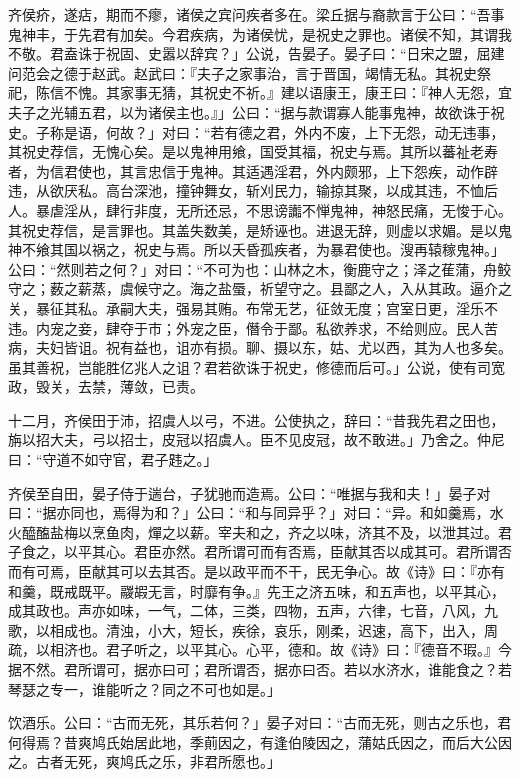 \documentclass[]{article}
\begin{document}
齐侯疥，遂痁，期而不瘳，诸侯之宾问疾者多在。梁丘据与裔款言于公曰：``吾事鬼神丰，于先君有加矣。今君疾病，为诸侯忧，是祝史之罪也。诸侯不知，其谓我不敬。君盍诛于祝固、史嚣以辞宾？」公说，告晏子。晏子曰：``日宋之盟，屈建问范会之德于赵武。赵武曰：『夫子之家事治，言于晋国，竭情无私。其祝史祭祀，陈信不愧。其家事无猜，其祝史不祈。』建以语康王，康王曰：『神人无怨，宜夫子之光辅五君，以为诸侯主也。』」公曰：``据与款谓寡人能事鬼神，故欲诛于祝史。子称是语，何故？」对曰：``若有德之君，外内不废，上下无怨，动无违事，其祝史荐信，无愧心矣。是以鬼神用飨，国受其福，祝史与焉。其所以蕃祉老寿者，为信君使也，其言忠信于鬼神。其适遇淫君，外内颇邪，上下怨疾，动作辟违，从欲厌私。高台深池，撞钟舞女，斩刈民力，输掠其聚，以成其违，不恤后人。暴虐淫从，肆行非度，无所还忌，不思谤讟不惮鬼神，神怒民痛，无悛于心。其祝史荐信，是言罪也。其盖失数美，是矫诬也。进退无辞，则虚以求媚。是以鬼神不飨其国以祸之，祝史与焉。所以夭昏孤疾者，为暴君使也。溲再辕稼鬼神。」公曰：``然则若之何？」对曰：``不可为也：山林之木，衡鹿守之；泽之萑蒲，舟鲛守之；薮之薪蒸，虞候守之。海之盐蜃，祈望守之。县鄙之人，入从其政。逼介之关，暴征其私。承嗣大夫，强易其贿。布常无艺，征敛无度；宫室日更，淫乐不违。内宠之妾，肆夺于市；外宠之臣，僭令于鄙。私欲养求，不给则应。民人苦病，夫妇皆诅。祝有益也，诅亦有损。聊、摄以东，姑、尤以西，其为人也多矣。虽其善祝，岂能胜亿兆人之诅？君若欲诛于祝史，修德而后可。」公说，使有司宽政，毁关，去禁，薄敛，已责。

十二月，齐侯田于沛，招虞人以弓，不进。公使执之，辞曰：``昔我先君之田也，旃以招大夫，弓以招士，皮冠以招虞人。臣不见皮冠，故不敢进。」乃舍之。仲尼曰：``守道不如守官，君子韪之。」

齐侯至自田，晏子侍于遄台，子犹驰而造焉。公曰：``唯据与我和夫！」晏子对曰：``据亦同也，焉得为和？」公曰：``和与同异乎？」对曰：``异。和如羹焉，水火醯醢盐梅以烹鱼肉，燀之以薪。宰夫和之，齐之以味，济其不及，以泄其过。君子食之，以平其心。君臣亦然。君所谓可而有否焉，臣献其否以成其可。君所谓否而有可焉，臣献其可以去其否。是以政平而不干，民无争心。故《诗》曰：『亦有和羹，既戒既平。鬷嘏无言，时靡有争。』先王之济五味，和五声也，以平其心，成其政也。声亦如味，一气，二体，三类，四物，五声，六律，七音，八风，九歌，以相成也。清浊，小大，短长，疾徐，哀乐，刚柔，迟速，高下，出入，周疏，以相济也。君子听之，以平其心。心平，德和。故《诗》曰：『德音不瑕。』今据不然。君所谓可，据亦曰可；君所谓否，据亦曰否。若以水济水，谁能食之？若琴瑟之专一，谁能听之？同之不可也如是。」

饮酒乐。公曰：``古而无死，其乐若何？」晏子对曰：``古而无死，则古之乐也，君何得焉？昔爽鸠氏始居此地，季萴因之，有逢伯陵因之，蒲姑氏因之，而后大公因之。古者无死，爽鸠氏之乐，非君所愿也。」
\end{document}
